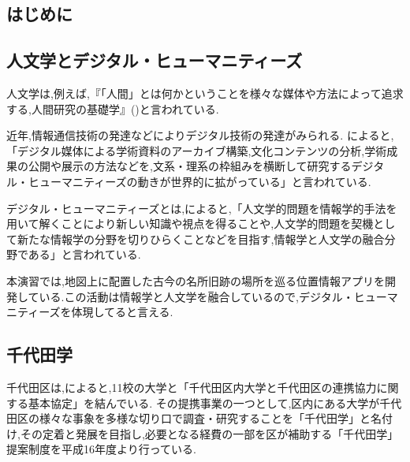 \documentclass[a4paper, twoside]{jarticle}
\begin{document}
\maketitle %
\begin{multicols}{2} %
\setcounter{page}{1} %

\section{はじめに}

\subsection{人文学とデジタル・ヒューマニティーズ}
人文学は,例えば,『「人間」とは何かということを様々な媒体や方法によって追求する,人間研究の基礎学』(\cite{huma})と言われている.\par
近年,情報通信技術の発達などによりデジタル技術の発達がみられる.
\cite{digihumu1}によると,「デジタル媒体による学術資料のアーカイブ構築,文化コンテンツの分析,学術成果の公開や展示の方法などを,文系・理系の枠組みを横断して研究するデジタル・ヒューマニティーズの動きが世界的に拡がっている」と言われている.\par

デジタル・ヒューマニティーズとは,\cite{digihumu2}によると,「人文学的問題を情報学的手法を用いて解くことにより新しい知識や視点を得ることや,人文学的問題を契機として新たな情報学の分野を切りひらくことなどを目指す,情報学と人文学の融合分野である」と言われている.

本演習では,地図上に配置した古今の名所旧跡の場所を巡る位置情報アプリを開発している.この活動は情報学と人文学を融合しているので,デジタル・ヒューマニティーズを体現してると言える.



\subsection{千代田学}
千代田区は,\cite{digi4}によると,11校の大学と「千代田区内大学と千代田区の連携協力に関する基本協定」を結んでいる.
その提携事業の一つとして,区内にある大学が千代田区の様々な事象を多様な切り口で調査・研究することを「千代田学」と名付け,その定着と発展を目指し,必要となる経費の一部を区が補助する「千代田学」提案制度を平成16年度より行っている.


\end{multicols}
\end{document}
